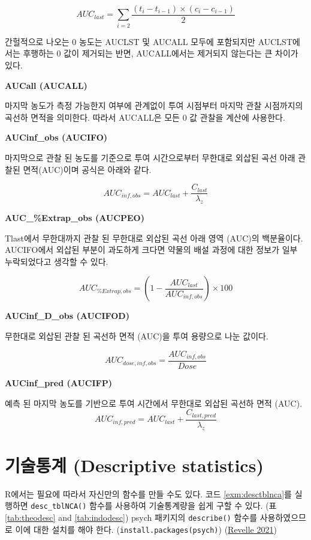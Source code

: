 \documentclass[
  11pt,
  krantz2, a4paper, twoside]{krantz}
\theoremstyle{definition}
\theoremstyle{definition}
\theoremstyle{definition}
\theoremstyle{definition}
\theoremstyle{remark}
\begin{document}
\[AUC_{last} = \sum_{i = 2}^{}\frac{(t_{i} - t_{i - 1}) \times (c_{i} - c_{i - 1})}{2}\]

간헐적으로 나오는 0 농도는 AUCLST 및 AUCALL 모두에 포함되지만 AUCLST에서는 후행하는 0 값이 제거되는 반면, AUCALL에서는 제거되지 않는다는 큰 차이가 있다.

\textbf{AUCall (AUCALL)}

마지막 농도가 측정 가능한지 여부에 관계없이 투여 시점부터 마지막 관찰 시점까지의 곡선하 면적을 의미한다. 따라서 AUCALL은 모든 0 값 관찰을 계산에 사용한다.

\textbf{AUCinf\_obs (AUCIFO)}

마지막으로 관찰 된 농도를 기준으로 투여 시간으로부터 무한대로 외삽된 곡선 아래 관찰된 면적(AUC)이며 공식은 아래와 같다.

\[AUC_{inf,obs} = AUC_{last} + \frac{C_{last}}{\lambda_{z}}\]

\textbf{AUC\_\%Extrap\_obs (AUCPEO)}

Tlast에서 무한대까지 관찰 된 무한대로 외삽된 곡선 아래 영역 (AUC)의 백분율이다. AUCIFO에서 외삽된 부분이 과도하게 크다면 약물의 배설 과정에 대한 정보가 일부 누락되었다고 생각할 수 있다.

\[AUC_{\% Extrap,obs} = (1 - \frac{AUC_{last}}{AUC_{inf,obs}}) \times 100\]

\textbf{AUCinf\_D\_obs (AUCIFOD)}

무한대로 외삽된 관찰 된 곡선하 면적 (AUC)을 투여 용량으로 나눈 값이다.

\[AUC_{dose,inf,obs} = \frac{AUC_{inf,obs}}{Dose}\]

\textbf{AUCinf\_pred (AUCIFP)}

예측 된 마지막 농도를 기반으로 투여 시간에서 무한대로 외삽된 곡선하 면적 (AUC).
\[AUC_{inf,pred} = AUC_{last} + \frac{C_{last,pred}}{\lambda_{z}}\]

\hypertarget{uxae30uxc220uxd1b5uxacc4-descriptive-statistics}{%
\section{기술통계 (Descriptive statistics)}\label{uxae30uxc220uxd1b5uxacc4-descriptive-statistics}}


R에서는 필요에 따라서 자신만의 함수를 만들 수도 있다.
코드 \ref{exm:desctblnca}를 실행하면 \texttt{desc\_tblNCA()} 함수를 사용하여 기술통계량을 쉽게 구할 수 있다. (표 \ref{tab:theodesc} and \ref{tab:indodesc})
psych 패키지의 \texttt{describe()} 함수를 사용하였으므로 이에 대한 설치를 해야 한다. (\texttt{install.packages(\textquotesingle{}psych\textquotesingle{})}) (\protect\hyperlink{ref-R-psych}{Revelle 2021})
\end{document}
